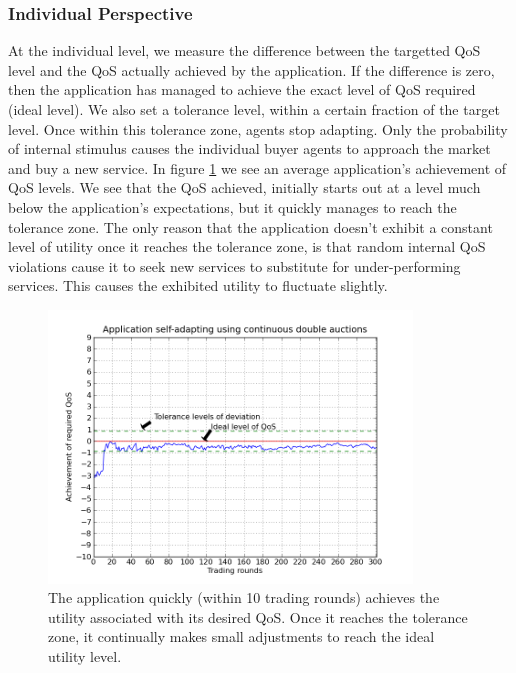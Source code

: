 \documentclass[10pt,journal,compsoc]{IEEEtran}
\begin{document}
\subsubsection{Individual Perspective}
At the individual level, we measure the difference between the targetted QoS level and the QoS actually achieved by the application. If the difference is zero, then the application has managed to achieve the exact level of QoS required (ideal level). We also set a tolerance level, within a certain fraction of the target level. Once within this tolerance zone, agents stop adapting. Only the probability of internal stimulus causes the individual buyer agents to approach the market and buy a new service. In figure \ref{goodness} we see an average application's achievement of QoS levels. We see that the QoS achieved, initially starts out at a level much below the application's expectations, but it quickly manages to reach the tolerance zone. The only reason that the application doesn't exhibit a constant level of utility once it reaches the tolerance zone, is that random internal QoS violations cause it to seek new services to substitute for under-performing services. This causes the exhibited utility to fluctuate slightly.\\
 \begin{figure}
    \includegraphics[width=3.8in]{graphs/Single_App_Self_Adaptation_Across_Rounds_With_QA_Change.png}
    \caption{The application quickly (within 10 trading rounds) achieves the utility associated with its desired QoS. Once it reaches the tolerance zone, it continually makes small adjustments to reach the ideal utility level. }
    \label{goodness}
\end{figure}	 
\end{document}

